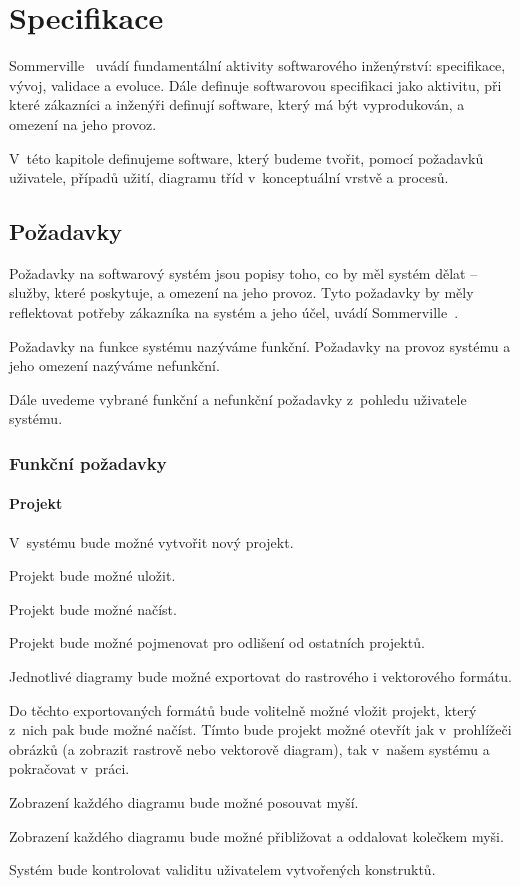 \chapter{Specifikace}

Sommerville~\cite{sommerville_software_2011} uvádí fundamentální aktivity softwarového inženýrství: specifikace, vývoj, validace a evoluce.
Dále definuje softwarovou specifikaci jako aktivitu, při které zákazníci a inženýři definují software, který má být vyprodukován, a omezení na jeho provoz.

V~této kapitole definujeme software, který budeme tvořit, pomocí požadavků uživatele, případů užití, diagramu tříd v~konceptuální vrstvě a procesů.

\section{Požadavky}

Požadavky na softwarový systém jsou popisy toho, co by měl systém dělat -- služby, které poskytuje, a omezení na jeho provoz.
Tyto požadavky by měly reflektovat potřeby zákazníka na systém a jeho účel, uvádí Sommerville~\cite[s.~83]{sommerville_software_2011}.

Požadavky na funkce systému nazýváme funkční.
Požadavky na provoz systému a jeho omezení nazýváme nefunkční.

Dále uvedeme vybrané funkční a nefunkční požadavky z~pohledu uživatele systému.

\subsection{Funkční požadavky}

\subsubsection*{Projekt}

\begin{enumfp}
  \item V~systému bude možné vytvořit nový projekt.
  \item Projekt bude možné uložit.
  \item Projekt bude možné načíst.
  \item Projekt bude možné pojmenovat pro odlišení od ostatních projektů.
  \item Jednotlivé diagramy bude možné exportovat do rastrového i vektorového formátu.
  \item Do těchto exportovaných formátů bude volitelně možné vložit projekt, který z~nich pak bude možné načíst.
  Tímto bude projekt možné otevřít jak v~prohlížeči obrázků (a zobrazit rastrově nebo vektorově diagram), tak v~našem systému a pokračovat v~práci.
  \item Zobrazení každého diagramu bude možné posouvat myší.
  \item Zobrazení každého diagramu bude možné přibližovat a oddalovat kolečkem myši.
  \item Systém bude kontrolovat validitu uživatelem vytvořených konstruktů.
\end{enumfp}


